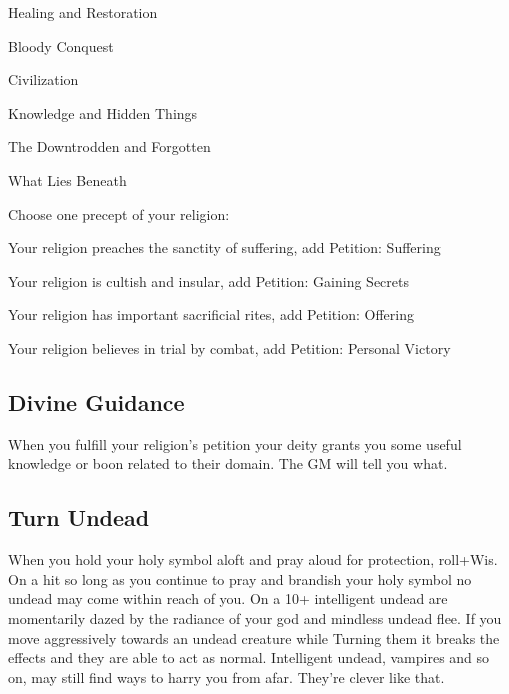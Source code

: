  
\startitemize[1,packed]

\item Healing and Restoration

 
\item Bloody Conquest

 
\item Civilization

 
\item Knowledge and Hidden Things

 
\item The Downtrodden and Forgotten

 
\item What Lies Beneath


\stopitemize
 

Choose one precept of your religion:

 
\startitemize[1,packed]

\item Your religion preaches the sanctity of suffering, add Petition: Suffering

 
\item Your religion is cultish and insular, add Petition: Gaining Secrets

 
\item Your religion has important sacrificial rites, add Petition: Offering

 
\item Your religion believes in trial by combat, add Petition: Personal Victory


\stopitemize


 


\subsection{Divine Guidance}    
 

When you fulfill your religion’s petition your deity grants you some useful knowledge or boon related to their domain. The GM will tell you what.



 


\subsection{Turn Undead}    
 

When you hold your holy symbol aloft and pray aloud for protection, roll+Wis. On a hit so long as you continue to pray and brandish your holy symbol no undead may come within reach of you. On a 10+ intelligent undead are momentarily dazed by the radiance of your god and mindless undead flee. If you move aggressively towards an undead creature while Turning them it breaks the effects and they are able to act as normal. Intelligent undead, vampires and so on, may still find ways to harry you from afar. They're clever like that.



